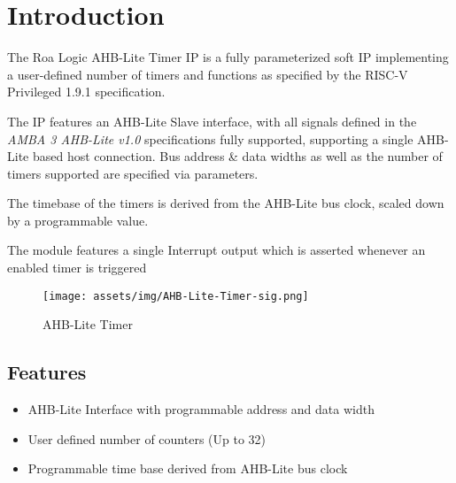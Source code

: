 \chapter{Introduction} \label{introduction}

The Roa Logic AHB-Lite Timer IP is a fully parameterized soft IP
implementing a user-defined number of timers and functions as specified
by the RISC-V Privileged 1.9.1 specification.

The IP features an AHB-Lite Slave interface, with all signals defined in
the \emph{AMBA 3 AHB-Lite v1.0} specifications fully supported,
supporting a single AHB-Lite based host connection. Bus address \& data
widths as well as the number of timers supported are specified via
parameters.

The timebase of the timers is derived from the AHB-Lite bus clock,
scaled down by a programmable value.

The module features a single Interrupt output which is asserted whenever
an enabled timer is triggered

\begin{figure}[tbh]
	\texttt{[image: assets/img/AHB-Lite-Timer-sig.png]}
	\caption{AHB-Lite Timer}
	\label{fig:ahb-lite-timer-sig}
\end{figure}

\section{Features}\label{features}

\begin{itemize}
\item
  AHB-Lite Interface with programmable address and data width
\item
  User defined number of counters (Up to 32)
\item
  Programmable time base derived from AHB-Lite bus clock
\end{itemize}